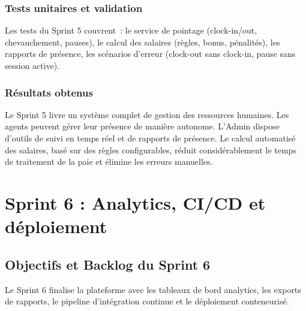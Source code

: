 \subsubsection{Tests unitaires et validation}

Les tests du Sprint 5 couvrent~: le service de pointage (clock-in/out, chevauchement,
pauses), le calcul des salaires (règles, bonus, pénalités), les rapports de présence,
les scénarios d'erreur (clock-out sans clock-in, pause sans session active).

\subsubsection{Résultats obtenus}

Le Sprint 5 livre un système complet de gestion des ressources humaines. Les agents
peuvent gérer leur présence de manière autonome. L'Admin dispose d'outils de suivi
en temps réel et de rapports de présence. Le calcul automatisé des salaires, basé
sur des règles configurables, réduit considérablement le temps de traitement de la
paie et élimine les erreurs manuelles.

\section[Sprint 6 : Analytics et CI/CD]{Sprint 6 : Analytics, CI/CD et déploiement}
\label{sec:sprint6}

\subsection{Objectifs et Backlog du Sprint 6}
\label{subsec:sprint6_backlog}

Le Sprint 6 finalise la plateforme avec les tableaux de bord analytics, les exports
de rapports, le pipeline d'intégration continue et le déploiement conteneurisé.

